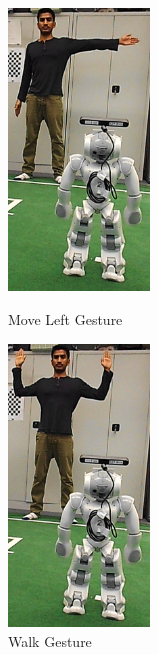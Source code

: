 \begin{figure}
\begin{minipage}
	\end{minipage}
	\begin{minipage}
		{.3
			\textwidth}  
		\centering
		\includegraphics[height=75mm]{figures/result/res-ges-move-left.png} \caption{Move Left Gesture} \label{res:ges:move:left} 
	\end{minipage}
	\begin{minipage}
		{.3
			\textwidth}  
		\centering
		\includegraphics[height=75mm]{figures/result/res-ges-walk.png} \caption{Walk Gesture} \label{res:ges:walk} 
	\end{minipage}	
\end{figure}
\label{res:ges}

